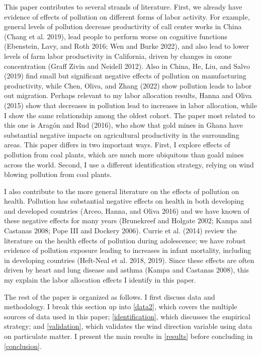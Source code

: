 \documentclass[
]{article}
\begin{document}
This paper contributes to several strands of literature. First, we already have evidence of effects of pollution on different forms of labor activity. For example, general levels of pollution decrease productivity of call center works in China (Chang et al. 2019), lead people to perform worse on cognitive functions (Ebenstein, Lavy, and Roth 2016; Wen and Burke 2022), and also lead to lower levels of farm labor productivity in California, driven by changes in ozone concentration (Graff Zivin and Neidell 2012). Also in China, He, Liu, and Salvo (2019) find small but significant negative effects of pollution on manufacturing productivity, while Chen, Oliva, and Zhang (2022) show pollution leads to labor out migration. Perhaps relevant to my labor allocation results, Hanna and Oliva (2015) show that decreases in pollution lead to increases in labor allocation, while I show the same relationship among the oldest cohort. The paper most related to this one is Aragón and Rud (2016), who show that gold mines in Ghana have substantial negative impacts on agricultural productivity in the surrounding areas. This paper differs in two important ways. First, I explore effects of pollution from coal plants, which are much more ubiquitous than goald mines across the world. Second, I use a different identification strategy, relying on wind blowing pollution from coal plants.

I also contribute to the more general literature on the effects of pollution on health. Pollution has substantial negative effects on health in both developing and developed countries (Arceo, Hanna, and Oliva 2016) and we have known of these negative effects for many years (Brunekreef and Holgate 2002; Kampa and Castanas 2008; Pope III and Dockery 2006). Currie et al. (2014) review the literature on the health effects of pollution during adolescence; we have robust evidence of pollution exposure leading to increases in infant mortality, including in developing countries (Heft-Neal et al. 2018, 2019). Since these effects are often driven by heart and lung disease and asthma (Kampa and Castanas 2008), this my explain the labor allocation effects I identify in this paper.

The rest of the paper is organized as follows. I first discuss data and methodology. I break this section up into \autoref{data2}, which covers the multiple sources of data used in this paper; \autoref{identification}, which discusses the empirical strategy; and \autoref{validation}, which validates the wind direction variable using data on particulate matter. I present the main results in \autoref{results} before concluding in \autoref{conclusion}.
\end{document}
